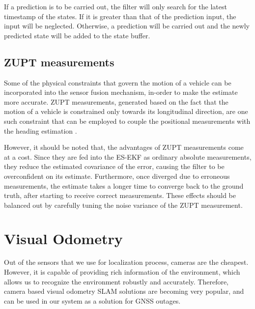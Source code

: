 If a prediction is to be carried out, the filter will only search for the latest timestamp of the states. If it is greater than that of the prediction input, the input will be neglected. Otherwise, a prediction will be carried out and the newly predicted state will be added to the state buffer.



\subsection{\acrlong{ZUPT} measurements}
Some of the physical constraints that govern the motion of a vehicle can be incorporated into the sensor fusion mechanism, in-order to make the estimate more accurate. \gls{ZUPT} measurements, generated based on the fact that the motion of a vehicle is constrained only towards its longitudinal direction, are one such constraint that can be employed to couple the positional measurements with the heading estimation \cite{pa:Dissanayake2001ZUPT}. 

However, it should be noted that, the advantages of \gls{ZUPT} measurements come at a cost. Since they are fed into the \gls{ES-EKF} as ordinary absolute measurements, they reduce the estimated covariance of the error, causing the filter to be overconfident on its estimate. Furthermore, once diverged due to erroneous measurements, the estimate takes a longer time to converge back to the ground truth, after starting to receive correct measurements. These effects should be balanced out by carefully tuning the noise variance of the \gls{ZUPT} measurement.







\section{Visual Odometry}
Out of the sensors that we use for localization process, cameras are the cheapest. However, it is capable of providing rich information of the environment, which allows us to recognize the environment robustly and accurately. Therefore, camera based visual odometry \gls{SLAM} solutions are becoming very popular, and can be used in our system as a solution for \gls{GNSS} outages. 

